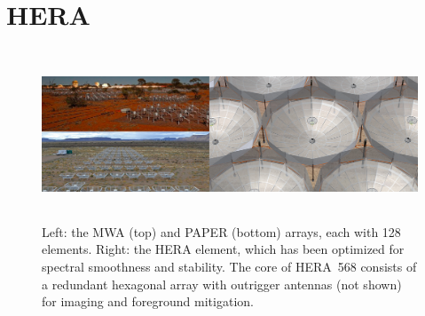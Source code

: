\documentclass[preprint]{aastex}
\begin{document}





\vspace{-0.25in}
\section{HERA}
\label{PDsec}
\begin{figure}[t]\centering
\includegraphics[height=2in]{plots/PAPER_and_MWA_and_HERA.jpg}
\caption{\small
Left: the MWA (top) and PAPER (bottom) arrays, each with 128 elements. Right:
the HERA element, which has been optimized for spectral smoothness and
stability. The core of HERA~568 consists of a redundant hexagonal array with
outrigger antennas (not shown) for imaging and foreground mitigation.
}
\label{HERAfig}
\end{figure}
\end{document}
